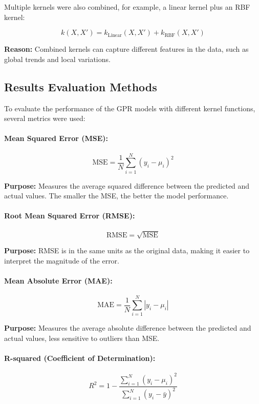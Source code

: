 \documentclass[11pt]{article}
\begin{document}
Multiple kernels were also combined, for example, a linear kernel plus an RBF kernel:

\[
k(X, X') = k_{\text{Linear}}(X, X') + k_{\text{RBF}}(X, X')
\]

\textbf{Reason:} Combined kernels can capture different features in the data, such as global trends and local variations.

\subsection{Results Evaluation Methods}

To evaluate the performance of the GPR models with different kernel functions, several metrics were used:

\paragraph{Mean Squared Error (MSE):}

\[
\text{MSE} = \frac{1}{N} \sum_{i=1}^{N} (y_i - \mu_i)^2
\]

\textbf{Purpose:} Measures the average squared difference between the predicted and actual values. The smaller the MSE, the better the model performance.

\paragraph{Root Mean Squared Error (RMSE):}

\[
\text{RMSE} = \sqrt{\text{MSE}}
\]

\textbf{Purpose:} RMSE is in the same units as the original data, making it easier to interpret the magnitude of the error.

\paragraph{Mean Absolute Error (MAE):}

\[
\text{MAE} = \frac{1}{N} \sum_{i=1}^{N} |y_i - \mu_i|
\]

\textbf{Purpose:} Measures the average absolute difference between the predicted and actual values, less sensitive to outliers than MSE.

\paragraph{R-squared (Coefficient of Determination):}

\[
R^2 = 1 - \frac{\sum_{i=1}^{N} (y_i - \mu_i)^2}{\sum_{i=1}^{N} (y_i - \bar{y})^2}
\]
\end{document}
